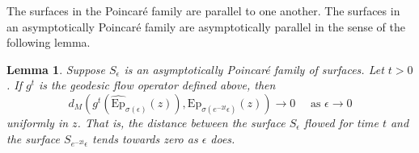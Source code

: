 \documentclass{amsart}
\newtheorem{lem}[thm]{Lemma}
\begin{document}
The surfaces in the Poincar\'e family are parallel to one another. The surfaces in an asymptotically Poincar\'e family are asymptotically parallel in the sense of the following lemma. 
 




\begin{lem}\label{asym-parallel-lemma}
Suppose $S_\epsilon$ is an asymptotically Poincar\'e family of surfaces. 
Let $t > 0$. 
If $g^t$ is the geodesic flow operator defined above, then  
\[
d_M \left(g^t (\widehat{\mathrm{Ep}}_{\sigma(\epsilon)}(z)), \mathrm{Ep}_{\sigma(e^{-2t} \epsilon)}(z) \right) \to 0
\quad \text{ as } \epsilon \to 0
\]
uniformly in $z$. 
That is, the distance between the surface $S_\epsilon$ flowed for time $t$ and the surface $S_{e^{-2t}\epsilon}$ tends towards zero as $\epsilon$ does. 
\end{lem}
\end{document}
